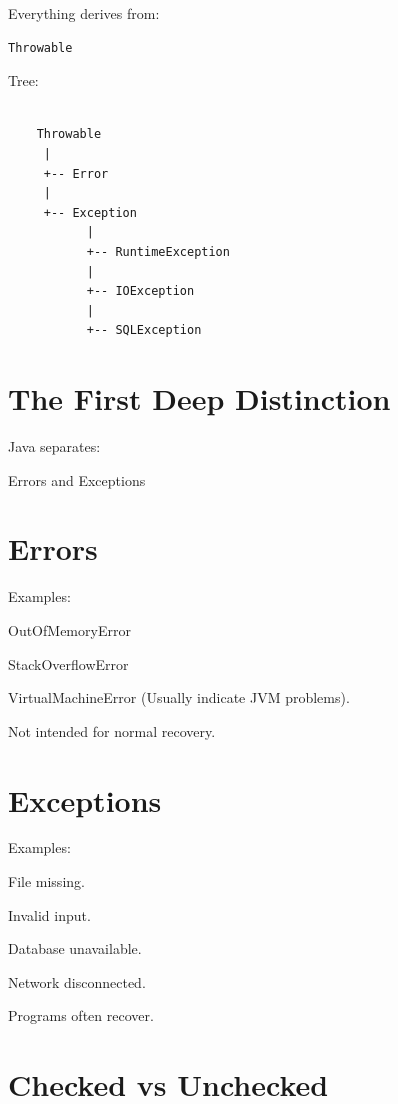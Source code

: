 \documentclass[11pt,a4paper]{book}
\begin{document}
Everything derives from:

\begin{verbatim} 
Throwable
\end{verbatim}

Tree:

\begin{verbatim}

    Throwable
     |
     +-- Error
     |
     +-- Exception
           |
           +-- RuntimeException
           |
           +-- IOException
           |
           +-- SQLException

\end{verbatim}

\section{The First Deep Distinction}

Java separates:

Errors and Exceptions

\section{Errors}

Examples:

OutOfMemoryError

StackOverflowError

VirtualMachineError (Usually indicate JVM problems).

Not intended for normal recovery.

\section{Exceptions}

Examples:

File missing.

Invalid input.

Database unavailable.

Network disconnected.

Programs often recover.

\section{Checked vs Unchecked}
\end{document}
